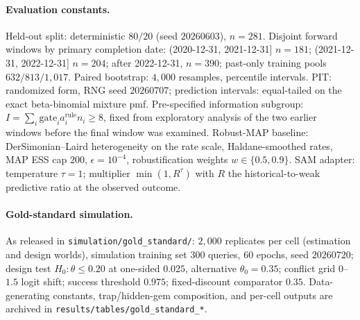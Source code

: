 \documentclass[11pt]{article}
\begin{document}
\paragraph{Evaluation constants.} Held-out split: deterministic $80/20$
(seed $20260603$), $n = 281$. Disjoint forward windows by primary completion
date: (2020-12-31, 2021-12-31] $n=181$; (2021-12-31, 2022-12-31] $n=204$;
after 2022-12-31, $n=390$; past-only training pools $632/813/1{,}017$.
Paired bootstrap: $4{,}000$ resamples, percentile intervals. PIT: randomized
form, RNG seed $20260707$; prediction intervals: equal-tailed on the exact
beta-binomial mixture pmf. Pre-specified information subgroup: $I = \sum_i
\mathrm{gate}_i a^{\mathrm{rule}}_i n_i \ge 8$, fixed from exploratory
analysis of the two earlier windows before the final window was examined.
Robust-MAP baseline: DerSimonian--Laird heterogeneity on the rate scale,
Haldane-smoothed rates, MAP ESS cap $200$, $\epsilon = 10^{-4}$,
robustification weights $w \in \{0.5, 0.9\}$. SAM adapter: temperature
$\tau = 1$; multiplier $\min(1, R^{\tau})$ with $R$ the
historical-to-weak predictive ratio at the observed outcome.

\paragraph{Gold-standard simulation.} As released in
\texttt{simulation/gold\_standard/}: $2{,}000$ replicates per cell (estimation
and design worlds), simulation training set $300$ queries, $60$ epochs, seed
$20260720$; design test $H_0: \theta \le 0.20$ at one-sided $0.025$,
alternative $\theta_0 = 0.35$; conflict grid $0$--$1.5$ logit shift; success
threshold $0.975$; fixed-discount comparator $0.35$. Data-generating
constants, trap/hidden-gem composition, and per-cell outputs are archived in
\texttt{results/tables/\allowbreak gold\_standard\_*}.
\end{document}
